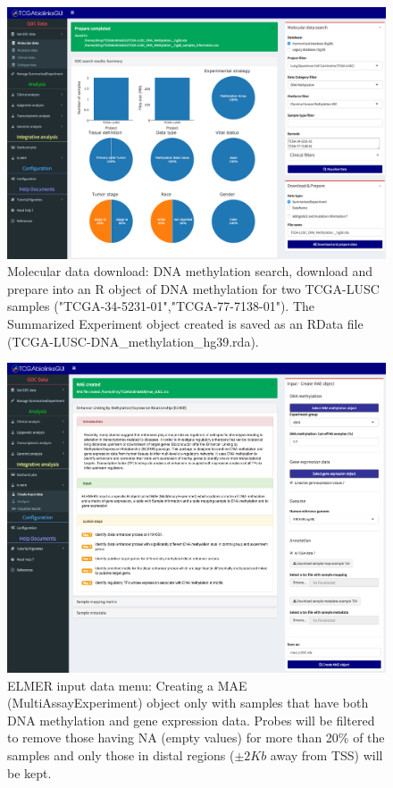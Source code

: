 \begin{figure}[h!]
\includegraphics[width=1.0\linewidth]{images/fig3-Data_methylation.png}

  \caption[TCGAbiolinksGUI: DNA methylation download ]{Molecular data download: DNA methylation search, download and prepare into an R object of DNA methylation for two TCGA-LUSC samples ("TCGA-34-5231-01","TCGA-77-7138-01"). The Summarized Experiment object created is saved as an RData file (TCGA-LUSC-DNA\_methylation\_hg39.rda). }
  \label{fig:dnamet}
   \end{figure}

  \begin{figure}[h!]
  \includegraphics[width=1.0\linewidth]{images/fig4-ELMER_MAE.png}

  \caption[TCGAbiolinksGUI: ELMER input data menu]{ELMER input data menu:
       Creating a MAE (MultiAssayExperiment) object only with samples that have both DNA methylation and gene expression data. Probes will be filtered to remove those having NA (empty values) for more than 20\% of the samples and only those in distal regions ($\pm2Kb$ away from TSS) will be kept. }
  \label{fig:elmer_input}
   \end{figure}

